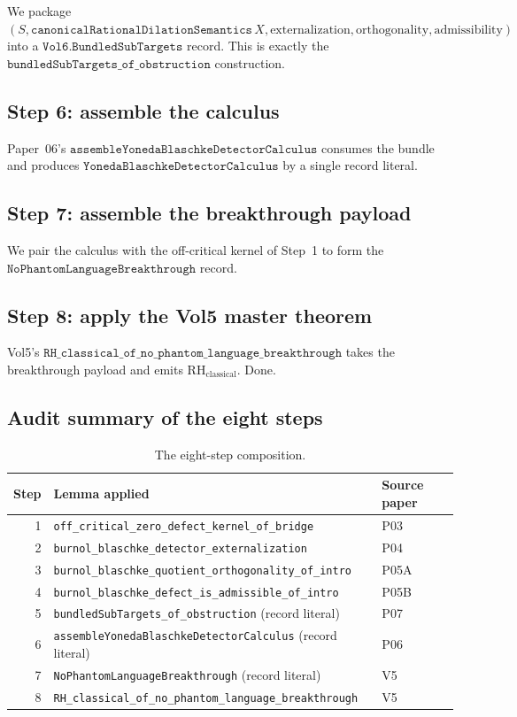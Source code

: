 \documentclass[11pt]{article}
\theoremstyle{plain}
\theoremstyle{definition}
\theoremstyle{remark}
\newcommand{\code}[1]{\texttt{#1}}
\newcommand{\RH}{\mathrm{RH}_{\mathrm{classical}}}
\begin{document}
We package
\((S, \code{canonicalRationalDilationSemantics}\,X,
   \text{externalization},
   \text{orthogonality}, \text{admissibility})\)
into a \(\code{Vol6.BundledSubTargets}\) record.  This is exactly the
\(\code{bundledSubTargets\_of\_obstruction}\) construction.

\subsection{Step 6: assemble the calculus}

Paper~06's
\(\code{assembleYonedaBlaschkeDetectorCalculus}\) consumes
the bundle and produces
\(\code{YonedaBlaschkeDetectorCalculus}\) by a single record
literal.

\subsection{Step 7: assemble the breakthrough payload}

We pair the calculus with the off-critical kernel of Step~1 to
form the
\(\code{NoPhantomLanguageBreakthrough}\) record.

\subsection{Step 8: apply the Vol5 master theorem}

Vol5's
\(\code{RH\_classical\_of\_no\_phantom\_language\_breakthrough}\)
takes the breakthrough payload and emits \(\RH\).  Done.

\subsection{Audit summary of the eight steps}

\begin{table}[h]
\centering
\small
\begin{tabular}{@{}r l l@{}}
\toprule
Step & Lemma applied & Source paper \\
\midrule
1 & \code{off\_critical\_zero\_defect\_kernel\_of\_bridge}            & P03 \\
2 & \code{burnol\_blaschke\_detector\_externalization}                 & P04 \\
3 & \code{burnol\_blaschke\_quotient\_orthogonality\_of\_intro}         & P05A \\
4 & \code{burnol\_blaschke\_defect\_is\_admissible\_of\_intro}          & P05B \\
5 & \code{bundledSubTargets\_of\_obstruction} (record literal)          & P07 \\
6 & \code{assembleYonedaBlaschkeDetectorCalculus} (record literal)     & P06 \\
7 & \code{NoPhantomLanguageBreakthrough} (record literal)              & V5 \\
8 & \code{RH\_classical\_of\_no\_phantom\_language\_breakthrough}      & V5 \\
\bottomrule
\end{tabular}
\caption{The eight-step composition.}
\label{tab:eight-step}
\end{table}
\end{document}
